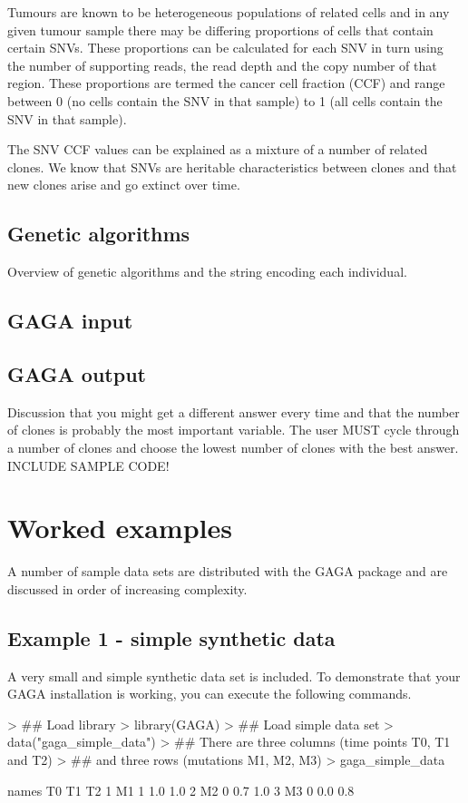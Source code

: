 \documentclass{article}
\begin{document}
Tumours are known to be heterogeneous populations of related cells and in any given tumour sample there may be differing proportions of cells that contain certain SNVs.  These proportions can be calculated for each SNV in turn using the number of supporting reads, the read depth and the copy number of that region.  These proportions are termed the cancer cell fraction (CCF) and range between 0 (no cells contain the SNV in that sample) to 1 (all cells contain the SNV in that sample).

The SNV CCF values can be explained as a mixture of a number of related clones.  We know that SNVs are heritable characteristics between clones and that new clones arise and go extinct over time.


\subsection{Genetic algorithms}
Overview of genetic algorithms and the string encoding each individual.
\subsection{GAGA input}
\subsection{GAGA output}

Discussion that you might get a different answer every time and that the number of clones is probably the most important variable.  The user MUST cycle through a number of clones and choose the lowest number of clones with the best answer.  INCLUDE SAMPLE CODE!


\section{Worked examples}
A number of sample data sets are distributed with the GAGA package and are discussed in order of increasing complexity.
\subsection{Example 1 - simple synthetic data}
A very small and simple synthetic data set is included.  To demonstrate that your GAGA installation is working, you can execute the following commands.  
\begin{Schunk}
\begin{Sinput}
> ## Load library
> library(GAGA)
> ## Load simple data set
> data("gaga_simple_data")
> ## There  are three columns (time points T0, T1 and T2)
> ## and three rows (mutations M1, M2, M3)
> gaga_simple_data
\end{Sinput}
\begin{Soutput}
  names T0  T1  T2
1    M1  1 1.0 1.0
2    M2  0 0.7 1.0
3    M3  0 0.0 0.8
\end{Soutput}
\end{Schunk}
\end{document}
